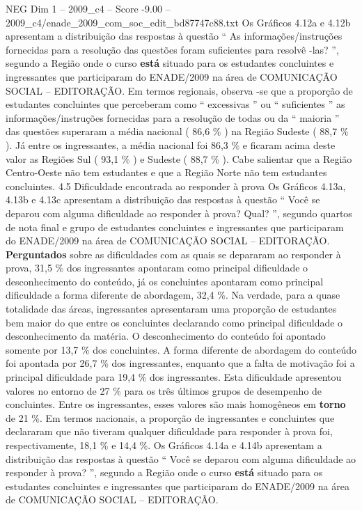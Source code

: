\begin{textsample}{NEG Dim 1 – 2009\_c4 – Score -9.00 – 2009\_c4/enade\_2009\_com\_soc\_edit\_bd87747c88.txt}
Os Gráficos 4.12a e 4.12b apresentam a distribuição das respostas à questão “ As informações/instruções fornecidas para a resolução das questões foram suficientes para resolvê -las? ”, segundo a Região onde o curso \textbf{está} situado para os estudantes concluintes e ingressantes que participaram do ENADE/2009 na área de COMUNICAÇÃO SOCIAL – EDITORAÇÃO.
Em termos regionais, observa -se que a proporção de estudantes concluintes que perceberam como “ excessivas ” ou “ suficientes ” as informações/instruções fornecidas para a resolução de todas ou da “ maioria ” das questões superaram a média nacional ( 86,6 \% ) na Região Sudeste ( 88,7 \% ).
Já entre os ingressantes, a média nacional foi 86,3 \% e ficaram acima deste valor as Regiões Sul ( 93,1 \% ) e Sudeste ( 88,7 \% ).
Cabe salientar que a Região Centro-Oeste não tem estudantes e que a Região Norte não tem estudantes concluintes. 4.5 Dificuldade encontrada ao responder à prova Os Gráficos 4.13a, 4.13b e 4.13c apresentam a distribuição das respostas à questão “ Você se deparou com alguma dificuldade ao responder à prova?
Qual? ”, segundo quartos de nota final e grupo de estudantes concluintes e ingressantes que participaram do ENADE/2009 na área de COMUNICAÇÃO SOCIAL – EDITORAÇÃO. \textbf{Perguntados} sobre as dificuldades com as quais se depararam ao responder à prova, 31,5 \% dos ingressantes apontaram como principal dificuldade o desconhecimento do conteúdo, já os concluintes apontaram como principal dificuldade a forma diferente de abordagem, 32,4 \%.
Na verdade, para a quase totalidade das áreas, ingressantes apresentaram uma proporção de estudantes bem maior do que entre os concluintes declarando como principal dificuldade o desconhecimento da matéria.
O desconhecimento do conteúdo foi apontado somente por 13,7 \% dos concluintes.
A forma diferente de abordagem do conteúdo foi apontada por 26,7 \% dos ingressantes, enquanto que a falta de motivação foi a principal dificuldade para 19,4 \% dos ingressantes.
Esta dificuldade apresentou valores no entorno de 27 \% para os três últimos grupos de desempenho de concluintes.
Entre os ingressantes, esses valores são mais homogêneos em \textbf{torno} de 21 \%.
Em termos nacionais, a proporção de ingressantes e concluintes que declararam que não tiveram qualquer dificuldade para responder à prova foi, respectivamente, 18,1 \% e 14,4 \%.
Os Gráficos 4.14a e 4.14b apresentam a distribuição das respostas à questão “ Você se deparou com alguma dificuldade ao responder à prova? ”, segundo a Região onde o curso \textbf{está} situado para os estudantes concluintes e ingressantes que participaram do ENADE/2009 na área de COMUNICAÇÃO SOCIAL – EDITORAÇÃO.

\end{textsample}
